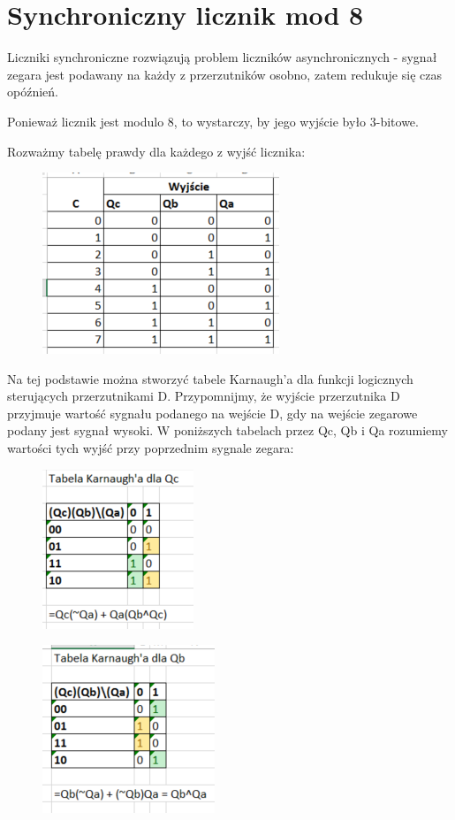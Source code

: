 \documentclass[12pt,a4paper]{article}
\begin{document}
\section{Synchroniczny licznik mod 8}

Liczniki synchroniczne rozwiązują problem liczników asynchronicznych - sygnał zegara jest podawany na każdy z przerzutników osobno, zatem redukuje się czas opóźnień.

Ponieważ licznik jest modulo 8, to wystarczy, by jego wyjście było 3-bitowe.

Rozważmy tabelę prawdy dla każdego z wyjść licznika:

\begin{figure}[H]
\centering
\includegraphics{img/4c_table}
\end{figure}

Na tej podstawie można stworzyć tabele Karnaugh'a dla funkcji logicznych sterujących przerzutnikami D.
Przypomnijmy, że wyjście przerzutnika D przyjmuje wartość sygnału podanego na wejście D, gdy na wejście zegarowe podany jest sygnał wysoki.
W poniższych tabelach przez Qc, Qb i Qa rozumiemy wartości tych wyjść przy poprzednim sygnale zegara:
 

\begin{figure}[H]
\centering
\includegraphics{img/4c_table_qc}
\end{figure}

\begin{figure}[H]
\centering
\includegraphics{img/4c_table_qb}
\end{figure}
\end{document}

